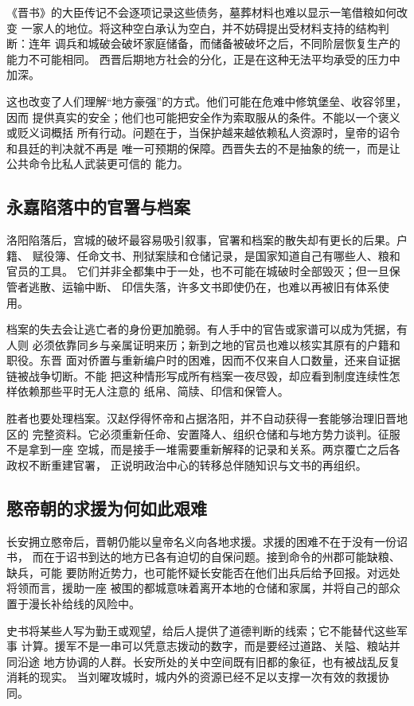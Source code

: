 《晋书》的大臣传记不会逐项记录这些债务，墓葬材料也难以显示一笔借粮如何改变
一家人的地位。将这种空白承认为空白，并不妨碍提出受材料支持的结构判断：连年
调兵和城破会破坏家庭储备，而储备被破坏之后，不同阶层恢复生产的能力不可能相同。
西晋后期地方社会的分化，正是在这种无法平均承受的压力中加深。

这也改变了人们理解“地方豪强”的方式。他们可能在危难中修筑堡垒、收容邻里，因而
提供真实的安全；他们也可能把安全作为索取服从的条件。不能以一个褒义或贬义词概括
所有行动。问题在于，当保护越来越依赖私人资源时，皇帝的诏令和县廷的判决就不再是
唯一可预期的保障。西晋失去的不是抽象的统一，而是让公共命令比私人武装更可信的
能力。

\subsection{永嘉陷落中的官署与档案}

洛阳陷落后，宫城的破坏最容易吸引叙事，官署和档案的散失却有更长的后果。户籍、
赋役簿、任命文书、刑狱案牍和仓储记录，是国家知道自己有哪些人、粮和官员的工具。
它们并非全都集中于一处，也不可能在城破时全部毁灭；但一旦保管者逃散、运输中断、
印信失落，许多文书即使仍在，也难以再被旧有体系使用。

档案的失去会让逃亡者的身份更加脆弱。有人手中的官告或家谱可以成为凭据，有人则
必须依靠同乡与亲属证明来历；新到之地的官员也难以核实其原有的户籍和职役。东晋
面对侨置与重新编户时的困难，因而不仅来自人口数量，还来自证据链被战争切断。不能
把这种情形写成所有档案一夜尽毁，却应看到制度连续性怎样依赖那些平时无人注意的
纸帛、简牍、印信和保管人。

胜者也要处理档案。汉赵俘得怀帝和占据洛阳，并不自动获得一套能够治理旧晋地区的
完整资料。它必须重新任命、安置降人、组织仓储和与地方势力谈判。征服不是拿到一座
空城，而是接手一堆需要重新解释的记录和关系。两京覆亡之后各政权不断重建官署，
正说明政治中心的转移总伴随知识与文书的再组织。

\subsection{愍帝朝的求援为何如此艰难}

长安拥立愍帝后，晋朝仍能以皇帝名义向各地求援。求援的困难不在于没有一份诏书，
而在于诏书到达的地方已各有迫切的自保问题。接到命令的州郡可能缺粮、缺兵，可能
要防附近势力，也可能怀疑长安能否在他们出兵后给予回报。对远处将领而言，援助一座
被围的都城意味着离开本地的仓储和家属，并将自己的部众置于漫长补给线的风险中。

史书将某些人写为勤王或观望，给后人提供了道德判断的线索；它不能替代这些军事
计算。援军不是一串可以凭意志拨动的数字，而是要经过道路、关隘、粮站并同沿途
地方协调的人群。长安所处的关中空间既有旧都的象征，也有被战乱反复消耗的现实。
当刘曜攻城时，城内外的资源已经不足以支撑一次有效的救援协同。

